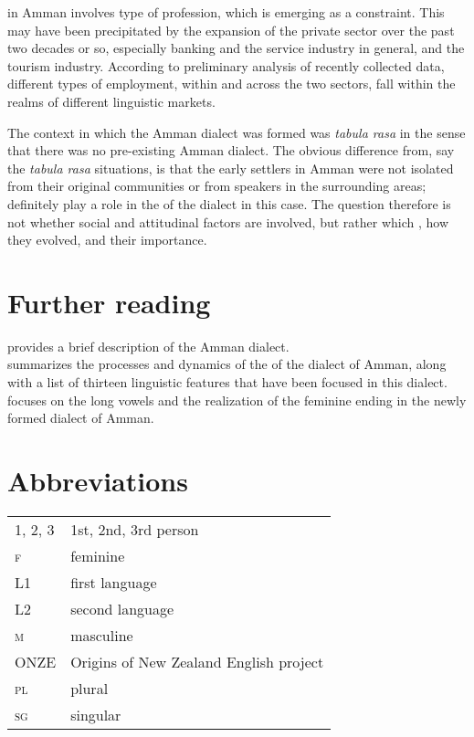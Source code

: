\documentclass[output=paper]{langsci/langscibook}
\begin{document}
 in Amman involves type of profession, which is emerging as a constraint. This may have been precipitated by the expansion of the private sector over the past two decades or so, especially banking and the service industry in general, and the tourism industry. According to preliminary analysis of recently collected data, different types of employment, within and across the two sectors, fall within the realms of different linguistic markets.

The context in which the Amman dialect was formed was \textit{tabula rasa} in the sense that there was no pre-existing Amman dialect. The obvious difference from, say the \textit{tabula rasa}  situations, is that the early settlers in Amman were not isolated from their original communities or from  speakers in the surrounding areas;  definitely play a role in the  of the dialect in this case. The question therefore is not whether social and attitudinal factors are involved, but rather which , how they evolved, and their  importance.

\section*{Further reading}

\citet{Al-Wer2011Amman} provides a brief description of the Amman dialect.\\
\citet{Al-Wer2007} summarizes the processes and dynamics of the  of the dialect of Amman, along with a list of thirteen linguistic features that have been focused in this dialect.\\
\citet{Al-Wer2002furtherreading} focuses on the long vowels and the realization of the feminine ending in the newly formed dialect of Amman.



\section*{Abbreviations}

\begin{tabularx}{1\textwidth}{@{}lQ@{}}
\textsc{1, 2, 3} & 1st, 2nd, 3rd person \\
\textsc{f}  &  feminine\\
L1 & first language \\
L2 & second language \\
\textsc{m}  &  masculine\\
ONZE & Origins of New Zealand {English} project \\
\textsc{pl}  &  plural\\
\textsc{sg}  &  singular\\
\end{tabularx}%


{\sloppy\printbibliography[heading=subbibliography,notkeyword=this]}
\end{document}
